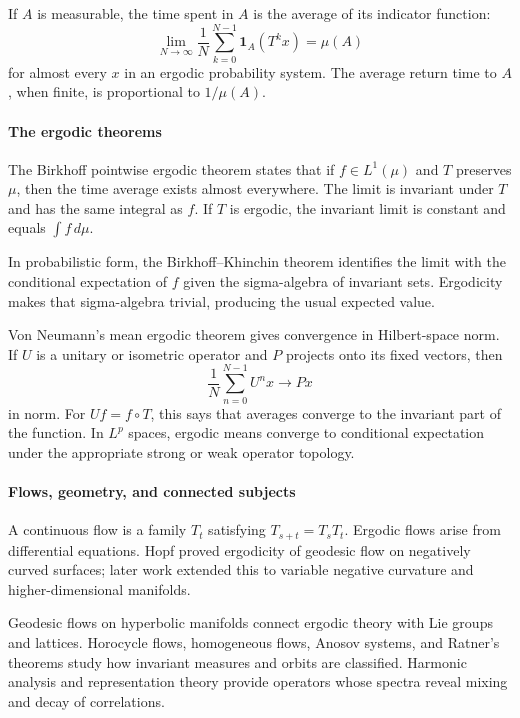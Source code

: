 If $A$ is measurable, the time spent in $A$ is the average of its indicator function:
\[
 \lim_{N\to\infty}\frac1N\sum_{k=0}^{N-1}\mathbf1_A(T^kx)=\mu(A)
\]
for almost every $x$ in an ergodic probability system. The average return time to $A$, when finite, is proportional to $1/\mu(A)$. \cite{ergodic_theory_ref1,ergodic_theory_ref4}

\paragraph{The ergodic theorems}

The Birkhoff pointwise ergodic theorem states that if $f\in L^1(\mu)$ and $T$ preserves $\mu$, then the time average exists almost everywhere. The limit is invariant under $T$ and has the same integral as $f$. If $T$ is ergodic, the invariant limit is constant and equals $\int f\,d\mu$.

In probabilistic form, the Birkhoff--Khinchin theorem identifies the limit with the conditional expectation of $f$ given the sigma-algebra of invariant sets. Ergodicity makes that sigma-algebra trivial, producing the usual expected value.

Von Neumann's mean ergodic theorem gives convergence in Hilbert-space norm. If $U$ is a unitary or isometric operator and $P$ projects onto its fixed vectors, then
\[
 \frac1N\sum_{n=0}^{N-1}U^nx\longrightarrow Px
\]
in norm. For $Uf=f\circ T$, this says that averages converge to the invariant part of the function. In $L^p$ spaces, ergodic means converge to conditional expectation under the appropriate strong or weak operator topology. \cite{ergodic_theory_ref1,ergodic_theory_ref5}

\paragraph{Flows, geometry, and connected subjects}

A continuous flow is a family $T_t$ satisfying $T_{s+t}=T_sT_t$. Ergodic flows arise from differential equations. Hopf proved ergodicity of geodesic flow on negatively curved surfaces; later work extended this to variable negative curvature and higher-dimensional manifolds.

Geodesic flows on hyperbolic manifolds connect ergodic theory with Lie groups and lattices. Horocycle flows, homogeneous flows, Anosov systems, and Ratner's theorems study how invariant measures and orbits are classified. Harmonic analysis and representation theory provide operators whose spectra reveal mixing and decay of correlations.

